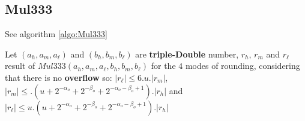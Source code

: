 \subsection{Mul333}
See algorithm \ref{algo:Mul333}

\begin{lem}[Mul333] Let $(a_h, a_m, a_{\ell})$ and $(b_h, b_m, b_{\ell})$ are   \textbf{triple-Double} number, $r_h$, $r_m$ and  $r_{\ell}$ result of $Mul333(a_h, a_m,a_{\ell},b_h,b_m,b_{\ell})$ for the $4$ modes of rounding, considering that there is no \textbf{overflow} so: $ \lvert r_{\ell} \rvert \le 6.u. \lvert r_m \rvert$, $\lvert r_m \rvert \le .(u + 2^{-\alpha_o}+2^{-\beta_o} +  2^{-\alpha_o - \beta_o+1}).\lvert r_h \rvert$ and $\lvert r_{\ell} \rvert \le u.(u + 2^{-\alpha_o}+2^{-\beta_o} +  2^{-\alpha_o - \beta_o+1}).\lvert r_h \rvert$
\end{lem}

